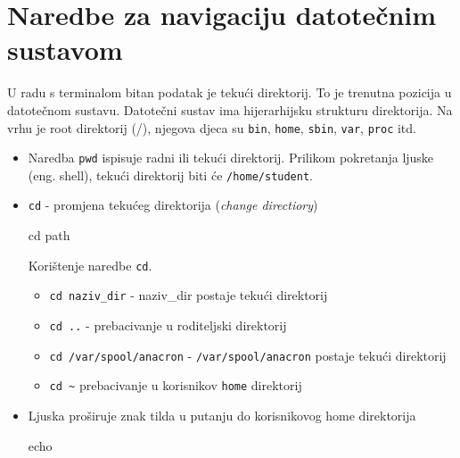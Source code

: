 \section{Naredbe za navigaciju datotečnim sustavom}
U radu s terminalom bitan podatak je tekući direktorij. To je trenutna pozicija u datotečnom sustavu.
Datotečni sustav ima hijerarhijsku strukturu direktorija. Na vrhu je root direktorij (/), njegova djeca su \texttt{bin}, \texttt{home}, \texttt{sbin}, \texttt{var}, \texttt{proc} itd.
\begin{itemize}
\item Naredba \texttt{pwd} ispisuje radni ili tekući direktorij. Prilikom pokretanja ljuske (eng. shell), tekući direktorij biti će \texttt{/home/student}.
\item \texttt{cd} - promjena tekućeg direktorija (\textit{change directiory})
\begin{prototip}
cd path
\end{prototip}

\begin{primjer} Korištenje naredbe \texttt{cd}.
\begin{itemize}
\item \texttt{cd naziv\_dir} - naziv\_dir postaje tekući direktorij
\item \texttt{cd ..} - prebacivanje u roditeljski direktorij
\item \texttt{cd /var/spool/anacron} -  \texttt{/var/spool/anacron} postaje tekući direktorij
\item \texttt{cd \~} prebacivanje u korisnikov \texttt{home} direktorij
\end{itemize}
\end{primjer}

\item Ljuska proširuje znak tilda u putanju do korisnikovog home direktorija

\begin{prototip}
echo ~
\end{prototip}


\end{itemize}
